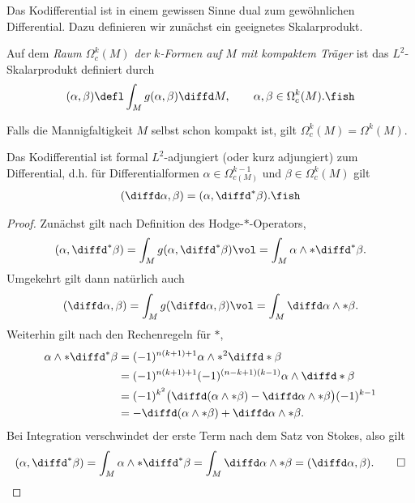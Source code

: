 \documentclass[%
	paper=a5,%
	fleqn,%
	DIV=18,%
	BCOR=0mm,
	fontsize=11pt,
	titlepage=false,%
	bibliography=totoc,
	DIV=18,%
	twoside=true,
	pdftitle=Riemannsche Geometrie,
	pdfauthor=Uwe Semmelmann,
	numbers=noendperiod]%
	{scrbook}
\begin{document}
Das Kodifferential ist in einem gewissen Sinne dual zum gewöhnlichen Differential. Dazu definieren wir zunächst ein geeignetes Skalarprodukt.

\begin{defn}
Auf dem \emph{Raum $\Omega_{c}^k(M)$ der $k$-Formen auf $M$ mit kompaktem Träger} ist das $L^2$-Skalarprodukt definiert durch
\begin{align*}
(\alpha,\beta)\defl \int_{M} g(\alpha,\beta)\diffd M,\qquad \alpha,\beta \in\Omega_{c}^k(M).\fish
\end{align*}
\end{defn}

Falls die Mannigfaltigkeit $M$ selbst schon kompakt ist, gilt $\Omega_{c}^k(M) = \Omega^k(M)$.

\begin{lem}
Das Kodifferential ist formal $L^2$-adjungiert (oder kurz adjungiert) zum Differential, d.h. für Differentialformen $\alpha\in\Omega^{k-1}_{c(M)}$ und $\beta\in\Omega^{k}_{c}(M)$ gilt
\begin{align*}
(\diffd\alpha,\beta) = (\alpha,\diffd^*\beta).\fish
\end{align*}
\end{lem}


\begin{proof}
Zunächst gilt nach Definition des Hodge-$*$-Operators,
\begin{align*}
(\alpha,\diffd^*\beta) = \int_{M} g(\alpha,\diffd^*\beta)\vol
= \int_{M} \alpha\wedge *\diffd^*\beta.
\end{align*}
Umgekehrt gilt dann natürlich auch
\begin{align*}
(\diffd\alpha,\beta) = \int_{M} g(\diffd\alpha,\beta)\vol = \int_{M} \diffd\alpha\wedge *\beta.
\end{align*}
Weiterhin gilt nach den Rechenregeln für $*$,
\begin{align*}
\alpha\wedge *\diffd^*\beta &= (-1)^{n(k+1)+1}\alpha\wedge *^2\diffd *\beta\\
&= (-1)^{n(k+1)+1}(-1)^{(n-k+1)(k-1)}\alpha\wedge \diffd *\beta\\
&= (-1)^{k^2}\bigl(\diffd(\alpha\wedge *\beta) - \diffd \alpha\wedge *\beta\bigr)(-1)^{k-1}\\
&=-\diffd(\alpha\wedge *\beta) + \diffd \alpha\wedge *\beta.
\end{align*}
Bei Integration verschwindet der erste Term nach dem Satz von Stokes, also gilt
\begin{align*}
(\alpha,\diffd^*\beta) = 
\int_{M} \alpha\wedge *\diffd^*\beta = 
\int_{M} \diffd \alpha\wedge *\beta = (\diffd\alpha,\beta).\qed
\end{align*}
\end{proof}
\end{document}
